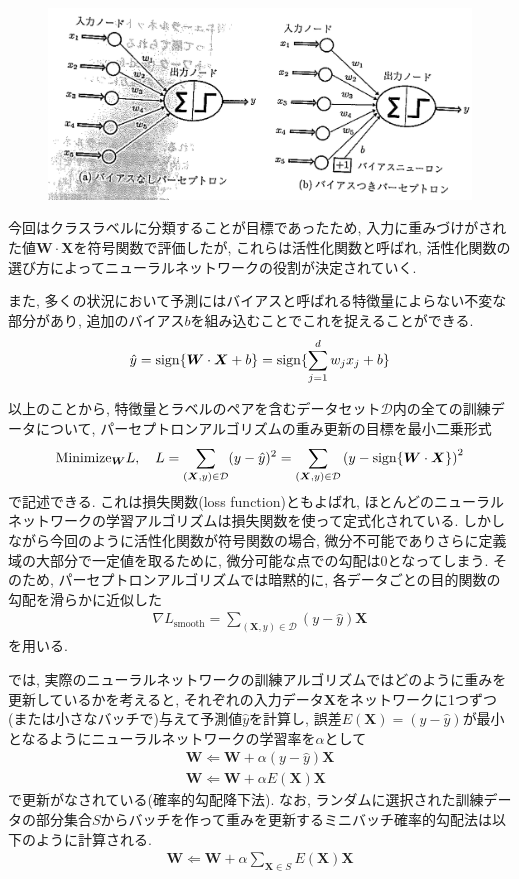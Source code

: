 \documentclass[dvipdfmx,report,11pt]{jsbook}
\begin{document}
\begin{figure}[H]
  \centering
    \includegraphics[width=0.5\linewidth]{figure/fig3.png}
    \caption{}
    \label{fig3}
\end{figure}

今回はクラスラベルに分類することが目標であったため, 入力に重みづけがされた値$\bm{W}\cdot \bm{X}$を符号関数で評価したが, これらは活性化関数と呼ばれ, 活性化関数の選び方によってニューラルネットワークの役割が決定されていく.

また, 多くの状況において予測にはバイアスと呼ばれる特徴量によらない不変な部分があり, 追加のバイアス$b$を組み込むことでこれを捉えることができる.
\begin{align}
  \hat{y}=\operatorname{sign}\{\bm{W}\cdot\bm{X}+b\}=\operatorname{sign}\{\sum_{j=1}^{d}w_jx_j+b\}
\end{align}



以上のことから, 特徴量とラベルのペアを含むデータセット$\mathcal{D}$内の全ての訓練データについて, パーセプトロンアルゴリズムの重み更新の目標を最小二乗形式
\begin{align}
  \text{Minimize}_{\bm{W}} L, \quad L=\sum_{(\bm{X},y)\in \mathcal{D}}(y-\hat{y})^2=\sum_{(\bm{X},y)\in \mathcal{D}}\left(y-\operatorname{sign}\{\bm{W}\cdot\bm{X}\}\right)^2\notag
\end{align}
で記述できる. これは損失関数(loss function)ともよばれ, ほとんどのニューラルネットワークの学習アルゴリズムは損失関数を使って定式化されている. しかしながら今回のように活性化関数が符号関数の場合, 微分不可能でありさらに定義域の大部分で一定値を取るために, 微分可能な点での勾配は0となってしまう. そのため, パーセプトロンアルゴリズムでは暗黙的に, 各データごとの目的関数の勾配を滑らかに近似した
\begin{align}
  \nabla L_{\text{smooth}}=\sum_{(\bm{X},y)\in \mathcal{D}}(y-\hat{y})\bm{X}
\end{align}
を用いる.

では, 実際のニューラルネットワークの訓練アルゴリズムではどのように重みを更新しているかを考えると, それぞれの入力データ$\bm{X}$をネットワークに1つずつ(または小さなバッチで)与えて予測値$\hat{y}$を計算し, 誤差$E(\bm{X})=(y-\hat{y})$が最小となるようにニューラルネットワークの学習率を$\alpha$として
\begin{align}
  \bm{W}\Leftarrow \bm{W}+\alpha (y-\hat{y})\bm{X}\label{eq:1.4}\\
  \bm{W}\Leftarrow \bm{W}+\alpha E(\bm{X})\bm{X}
\end{align}
で更新がなされている(確率的勾配降下法). なお, ランダムに選択された訓練データの部分集合$S$からバッチを作って重みを更新するミニバッチ確率的勾配法は以下のように計算される.
\begin{align}
  \bm{W}\Leftarrow \bm{W}+\alpha \sum_{\bm{X}\in S}E(\bm{X})\bm{X}\label{eq:1.6}
\end{align}
\end{document}
